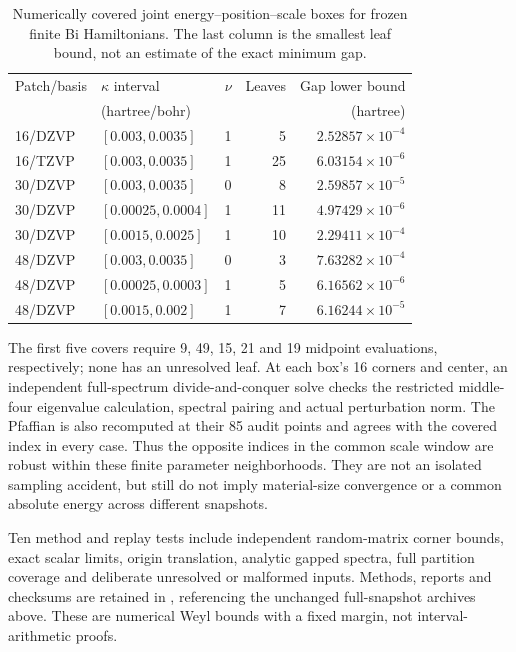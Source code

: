 \documentclass[11pt]{article}
\begin{document}
\begin{table}[htbp]
\centering
\small
\begin{tabular}{llrrr}
\toprule
Patch/basis & $\kappa$ interval & $\nu$ & Leaves & Gap lower bound\\
 & (hartree/bohr) & & & (hartree)\\
\midrule
16/DZVP & $[0.003,0.0035]$ & 1 & 5 & $2.52857\times10^{-4}$\\
16/TZVP & $[0.003,0.0035]$ & 1 & 25 & $6.03154\times10^{-6}$\\
30/DZVP & $[0.003,0.0035]$ & 0 & 8 & $2.59857\times10^{-5}$\\
30/DZVP & $[0.00025,0.0004]$ & 1 & 11 & $4.97429\times10^{-6}$\\
30/DZVP & $[0.0015,0.0025]$ & 1 & 10 & $2.29411\times10^{-4}$\\
48/DZVP & $[0.003,0.0035]$ & 0 & 3 & $7.63282\times10^{-4}$\\
48/DZVP & $[0.00025,0.0003]$ & 1 & 5 & $6.16562\times10^{-6}$\\
48/DZVP & $[0.0015,0.002]$ & 1 & 7 & $6.16244\times10^{-5}$\\
\bottomrule
\end{tabular}
\caption{Numerically covered joint energy--position--scale boxes
for frozen finite Bi Hamiltonians. The last column is the smallest
leaf bound, not an estimate of the exact minimum gap.}
\label{tab:bi-regions}
\end{table}

The first five covers require 9, 49, 15, 21 and 19 midpoint evaluations,
respectively; none has an unresolved leaf. At each box's 16 corners
and center, an independent full-spectrum divide-and-conquer solve
checks the restricted middle-four eigenvalue calculation, spectral
pairing and actual perturbation norm. The Pfaffian is also recomputed
at their 85 audit points and agrees with the covered index in every case.
Thus the opposite indices in the common scale window are robust
within these finite parameter neighborhoods. They are not an
isolated sampling accident, but still do not imply material-size
convergence or a common absolute energy across different snapshots.

Ten method and replay tests include independent random-matrix
corner bounds, exact scalar limits, origin translation, analytic
gapped spectra, full partition coverage and deliberate unresolved
or malformed inputs. Methods, reports and checksums are retained in
, referencing
the unchanged full-snapshot archives above. These are numerical
Weyl bounds with a fixed margin, not interval-arithmetic proofs.
\end{document}
